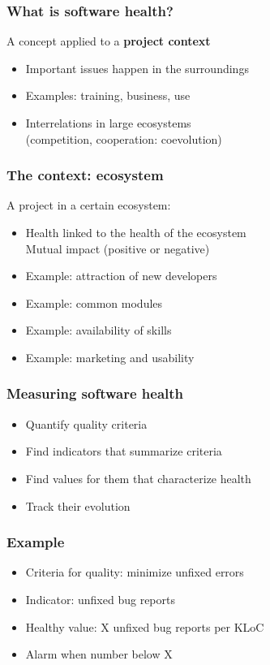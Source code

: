 \documentclass[17pt,aspectratio=169,hyperref=pdfusetitle]{beamer}
\begin{document}
\begin{frame}[fragile]
  \frametitle{What is software health?}

  A concept applied to a \textbf{project context}
  
  \begin{itemize}
  \item Important issues happen in the surroundings
  \item Examples: training, business, use
  \item Interrelations in large ecosystems \\
    (competition, cooperation: coevolution)
  \end{itemize}
\end{frame}

\begin{frame}[fragile]
  \frametitle{The context: ecosystem}

  A project in a certain ecosystem:

  \begin{itemize}
  \item Health linked to the health of the ecosystem \\
    Mutual impact (positive or negative)
  \item Example: attraction of new developers
  \item Example: common modules
  \item Example: availability of skills
  \item Example: marketing and usability
  \end{itemize}
\end{frame}

\begin{frame}[fragile]
  \frametitle{Measuring software health}

  \begin{itemize}
  \item Quantify quality criteria
  \item Find indicators that summarize criteria
  \item Find values for them that characterize health
  \item Track their evolution
  \end{itemize}
\end{frame}

\begin{frame}[fragile]
  \frametitle{Example}

  \begin{itemize}
  \item Criteria for quality: minimize unfixed errors 
  \item Indicator: unfixed bug reports
  \item Healthy value: X unfixed bug reports per KLoC
  \item Alarm when number below X
  \end{itemize}
\end{frame}
\end{document}
